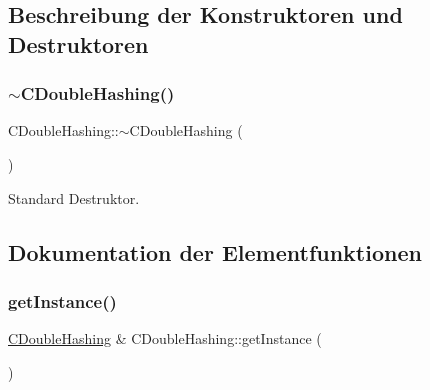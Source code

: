 \subsection{Beschreibung der Konstruktoren und Destruktoren}
\mbox{\label{class_c_double_hashing_a4ffc5039f507c1def31ca5bc672ce8e2}} 
\subsubsection{\texorpdfstring{$\sim$\+C\+Double\+Hashing()}{~CDoubleHashing()}}
{\footnotesize\ttfamily C\+Double\+Hashing\+::$\sim$\+C\+Double\+Hashing (\begin{DoxyParamCaption}{ }\end{DoxyParamCaption})\hspace{0.3cm}{\ttfamily [virtual]}}



Standard Destruktor. 



\subsection{Dokumentation der Elementfunktionen}
\mbox{\label{class_c_double_hashing_a3917e940f9bac5c981156062eb2b1169}} 
\subsubsection{\texorpdfstring{get\+Instance()}{getInstance()}}
{\footnotesize\ttfamily \hyperlink{class_c_double_hashing}{C\+Double\+Hashing} \& C\+Double\+Hashing\+::get\+Instance (\begin{DoxyParamCaption}{ }\end{DoxyParamCaption})\hspace{0.3cm}{\ttfamily [static]}}

